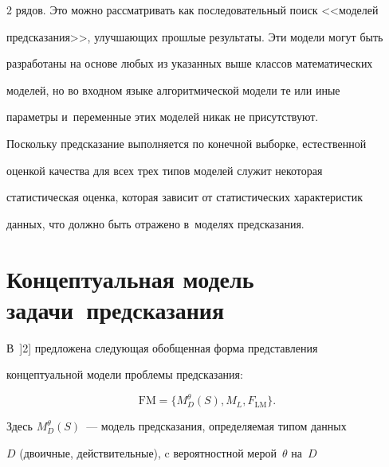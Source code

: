\begin{multicols}{2}
рядов. Это можно рас\-смат\-ри\-вать как последовательный поиск <<моделей 


предсказания>>, улуч\-ша\-ющих прошлые результаты. Эти модели могут быть 


разработаны на основе любых из указанных выше классов математических 


моделей, но во входном языке алгоритмической модели те или иные 


параметры и~переменные этих моделей никак не присутствуют.


  


  Поскольку предсказание выполняется по конечной выборке, естественной 


оценкой качества для всех трех типов моделей служит некоторая 


статистическая оценка, которая зависит от статистических характеристик 


данных, что должно быть отражено в~моделях предсказания.










\section{Концептуальная модель задачи~предсказания}










  В~]2] предложена следующая обобщенная форма представления 


концептуальной модели проблемы предсказания:


  \begin{equation}


  \mathrm{FM}=\{M^\theta_D(S), M_L, F_{\mathrm{LM}}\}.


  \label{e1-fr}


  \end{equation}


Здесь $M^\theta_D(S)$~--- модель предсказания, опре\-де\-ля\-емая типом данных 


$D$ (двоичные, действительные), c вероятностной мерой~$\theta$ на~$D$ 



\end{multicols}
